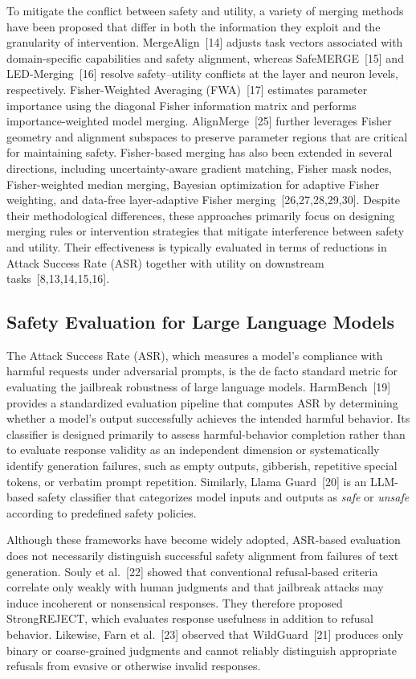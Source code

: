 \documentclass{article}
\begin{document}
To mitigate the conflict between safety and utility, a variety of merging methods have been proposed that differ in both the information they exploit and the granularity of intervention. MergeAlign~[14] adjusts task vectors associated with domain-specific capabilities and safety alignment, whereas SafeMERGE~[15] and LED-Merging~[16] resolve safety--utility conflicts at the layer and neuron levels, respectively. Fisher-Weighted Averaging (FWA)~[17] estimates parameter importance using the diagonal Fisher information matrix and performs importance-weighted model merging. AlignMerge~[25] further leverages Fisher geometry and alignment subspaces to preserve parameter regions that are critical for maintaining safety.
Fisher-based merging has also been extended in several directions, including uncertainty-aware gradient matching, Fisher mask nodes, Fisher-weighted median merging, Bayesian optimization for adaptive Fisher weighting, and data-free layer-adaptive Fisher merging~[26,27,28,29,30].
Despite their methodological differences, these approaches primarily focus on designing merging rules or intervention strategies that mitigate interference between safety and utility. Their effectiveness is typically evaluated in terms of reductions in Attack Success Rate (ASR) together with utility on downstream tasks~[8,13,14,15,16].

\color{red}
\subsection{Safety Evaluation for Large Language Models}
The Attack Success Rate (ASR), which measures a model's compliance with harmful requests under adversarial prompts, is the de facto standard metric for evaluating the jailbreak robustness of large language models. HarmBench~[19] provides a standardized evaluation pipeline that computes ASR by determining whether a model's output successfully achieves the intended harmful behavior. Its classifier is designed primarily to assess harmful-behavior completion rather than to evaluate response validity as an independent dimension or systematically identify generation failures, such as empty outputs, gibberish, repetitive special tokens, or verbatim prompt repetition. Similarly, Llama Guard~[20] is an LLM-based safety classifier that categorizes model inputs and outputs as \textit{safe} or \textit{unsafe} according to predefined safety policies.

Although these frameworks have become widely adopted, ASR-based evaluation does not necessarily distinguish successful safety alignment from failures of text generation. Souly et al.~[22] showed that conventional refusal-based criteria correlate only weakly with human judgments and that jailbreak attacks may induce incoherent or nonsensical responses. They therefore proposed StrongREJECT, which evaluates response usefulness in addition to refusal behavior. Likewise, Farn et al.~[23] observed that WildGuard~[21] produces only binary or coarse-grained judgments and cannot reliably distinguish appropriate refusals from evasive or otherwise invalid responses.
\end{document}
